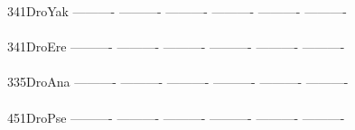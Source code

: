 \documentclass[11pt,twoside,reqno,a4paper]{article}
\begin{document}
{341\hspace*{1\charwidth}DroYak	----------	----------	----------	----------	----------	----------	\\
\hspace*{4\charwidth}\hspace*{7\charwidth}\hspace*{1\charwidth}\hspace*{1\charwidth}\hspace*{1\charwidth}\hspace*{1\charwidth}\hspace*{1\charwidth}\hspace*{1\charwidth}\\
341\hspace*{1\charwidth}DroEre	----------	----------	----------	----------	----------	----------	\\
\hspace*{4\charwidth}\hspace*{7\charwidth}\hspace*{1\charwidth}\hspace*{1\charwidth}\hspace*{1\charwidth}\hspace*{1\charwidth}\hspace*{1\charwidth}\hspace*{1\charwidth}\\
335\hspace*{1\charwidth}DroAna	----------	----------	----------	----------	----------	----------	\\
\hspace*{4\charwidth}\hspace*{7\charwidth}\hspace*{1\charwidth}\hspace*{1\charwidth}\hspace*{1\charwidth}\hspace*{1\charwidth}\hspace*{1\charwidth}\hspace*{1\charwidth}\\
451\hspace*{1\charwidth}DroPse	----------	----------	----------	----------	----------	----------	\\
\hspace*{4\charwidth}\hspace*{7\charwidth}\hspace*{1\charwidth}\hspace*{1\charwidth}\hspace*{1\charwidth}\hspace*{1\charwidth}\hspace*{1\charwidth}\hspace*{1\charwidth}\\
}
\end{document}
